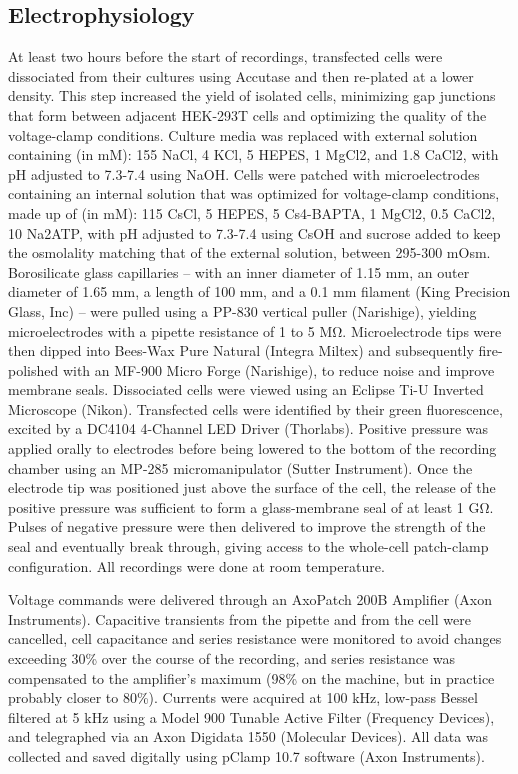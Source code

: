 \subsection{Electrophysiology}
At least two hours before the start of recordings, transfected cells were dissociated from their cultures using Accutase and then re-plated at a lower density. This step increased the yield of isolated cells, minimizing gap junctions that form between adjacent HEK-293T cells and optimizing the quality of the voltage-clamp conditions. Culture media was replaced with external solution containing (in mM): 155 NaCl, 4 KCl, 5 HEPES, 1 MgCl2, and 1.8 CaCl2, with pH adjusted to 7.3-7.4 using NaOH. Cells were patched with microelectrodes containing an internal solution that was optimized for voltage-clamp conditions, made up of (in mM): 115 CsCl, 5 HEPES, 5 Cs4-BAPTA, 1 MgCl2, 0.5 CaCl2, 10 Na2ATP, with pH adjusted to 7.3-7.4 using CsOH and sucrose added to keep the osmolality matching that of the external solution, between 295-300 mOsm. Borosilicate glass capillaries – with an inner diameter of 1.15 mm, an outer diameter of 1.65 mm, a length of 100 mm, and a 0.1 mm filament (King Precision Glass, Inc) – were pulled using a PP-830 vertical puller (Narishige), yielding microelectrodes with a pipette resistance of 1 to 5 MΩ. Microelectrode tips were then dipped into Bees-Wax Pure Natural (Integra Miltex) and subsequently fire-polished with an MF-900 Micro Forge (Narishige), to reduce noise and improve membrane seals. Dissociated cells were viewed using an Eclipse Ti-U Inverted Microscope (Nikon). Transfected cells were identified by their green fluorescence, excited by a DC4104 4-Channel LED Driver (Thorlabs). Positive pressure was applied orally to electrodes before being lowered to the bottom of the recording chamber using an MP-285 micromanipulator (Sutter Instrument). Once the electrode tip was positioned just above the surface of the cell, the release of the positive pressure was sufficient to form a glass-membrane seal of at least 1 GΩ. Pulses of negative pressure were then delivered to improve the strength of the seal and eventually break through, giving access to the whole-cell patch-clamp configuration. All recordings were done at room temperature.

Voltage commands were delivered through an AxoPatch 200B Amplifier (Axon Instruments). Capacitive transients from the pipette and from the cell were cancelled, cell capacitance and series resistance were monitored to avoid changes exceeding 30\% over the course of the recording, and series resistance was compensated to the amplifier’s maximum (98\% on the machine, but in practice probably closer to 80\%). Currents were acquired at 100 kHz, low-pass Bessel filtered at 5 kHz using a Model 900 Tunable Active Filter (Frequency Devices), and telegraphed via an Axon Digidata 1550 (Molecular Devices). All data was collected and saved digitally using pClamp 10.7 software (Axon Instruments).

